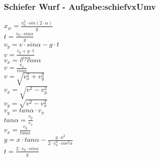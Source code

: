 \subsubsection{Schiefer Wurf  - Aufgabe:schiefvxUmv} 
\begin{minipage}{0.45\textwidth} 
$ x_{w}  = \frac{v_{0} ^{2} \cdot sin(2\cdot \alpha )}{       g} $\\ 
$ t =\frac{v_{0} \cdot sin \alpha }{  g} $\\ 
$ v_{y}  =  v\cdot sin\alpha - g\cdot t $\\ 
$ v= \frac{ v_{y} +g\cdot t}{ sin\alpha } $\\ 
$ v_{x}  = v\cdot  cos\alpha $\\ 
$ v= \frac{ v_{x} }{ cos\alpha } $\\ 
$ v= \sqrt{ v_{x} ^{2} + v_{y} ^{2} } $\\ 
$ v_{x} = \sqrt{ v^{2}  - v_{y} ^{2} } $\\ 
$ v_{y} = \sqrt{ v^{2}  - v_{x} ^{2} } $\\ 
$ v_{y} = tan \alpha \cdot  v_{x} $\\ 
$ tan \alpha = \frac{v_{y} }{v_{x} } $\\ 
$ v_{x} = \frac{v_{y} }{tan \alpha } $\\ 
$ y = x\cdot tan \alpha  - \frac{   g\cdot x^{2} }{2\cdot v^{2} _{0} \cdot cos ^{2}\alpha } $\\ 
$ t =\frac{2\cdot v_{0} \cdot sin \alpha }{ g} $\\ 
\end{minipage} 
\begin{minipage}{0.45\textwidth} 
 
\end{minipage} 
